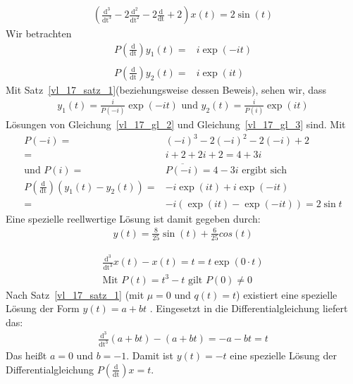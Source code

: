 \begin{Beispiel}{
	\begin{align*}
		\left(\frac{\mathrm{d^3}}{\mathrm{dt^3}} - 2 \frac{\mathrm{d^2}}
			{\mathrm{dt^2}} - 2 \frac{\mathrm{d}}{\mathrm{dt}} + 2\right) 
			x(t) = 2 \sin(t)
	\end{align*}
	Wir betrachten 
	\begin{align}
		P \left( \frac{\mathrm{d}}{\mathrm{dt}}\right)y_1(t) =& i\exp(-it) \\
			\label{vl_17_gl_2} \\
		P \left( \frac{\mathrm{d}}{\mathrm{dt}} \right) y_2(t) = & i \exp(it)
			\label{vl_17_gl_3}
	\end{align}
	Mit Satz~\ref{vl_17_satz_1}(beziehungsweise dessen Beweis),  sehen wir, dass 
	\begin{align*}
		y_1(t) = \frac{i}{P(-i)} \exp(-it) \text{ und }y_2(t) = \frac{i}{P(i)}
			\exp(it)
	\end{align*}
	Lösungen von Gleichung~\ref{vl_17_gl_2} und Gleichung~\ref{vl_17_gl_3} sind.
	Mit 
	\begin{align*}
		P(-i) = & (-i)^3 -2(-i)^2-2(-i)+2 \\ = & i + 2 + 2i + 2 = 4 +3i \\
		\text{und } P(i) = & \overline{P(-i)} = 4 -3i \text{ ergibt sich} \\
		P\left(\frac{\mathrm{d}}{\mathrm{dt}}\right)\left( y_1(t) - y_2(t)\right)
		= & -i \exp(it) + i \exp(-it)  \\
		= & -i (\exp(it) - \exp (-it)) = 2 \sin t
	\end{align*}
	Eine spezielle reellwertige Lösung ist damit gegeben durch:
	\begin{align*}
		y(t) = \frac{8}{25} \sin(t) + \frac{6}{25 }cos(t)
	\end{align*}
}\end{Beispiel}

\begin{Beispiel}{
	\begin{align*}
		\frac{\mathrm{d^3}}{\mathrm{dt^3}} x(t) - x(t) = t = t \exp(0 \cdot t) \\
		\text{Mit } P(t) = t^3 -t \text{ gilt } P(0) \neq 0
	\end{align*}
	Nach Satz~\ref{vl_17_satz_1} (mit $\mu=0$ und $q(t)=t$) existiert eine spezielle Lösung der Form $y(t) = a + bt$ 
	. Eingesetzt in die Differentialgleichung liefert das: 
	\begin{align*}
		\frac{\mathrm{d^3}}{\mathrm{dt^3}}(a+bt) - (a +bt) = - a -bt = t
	\end{align*}
	Das heißt $a = 0$ und $b = -1$. Damit ist $y(t) = -t$ eine spezielle Lösung 
	der Differentialgleichung $P \left( \frac{\mathrm{d}}{\mathrm{dt}}\right) 
	x = t$.
}\end{Beispiel}
\cleardoublepage
